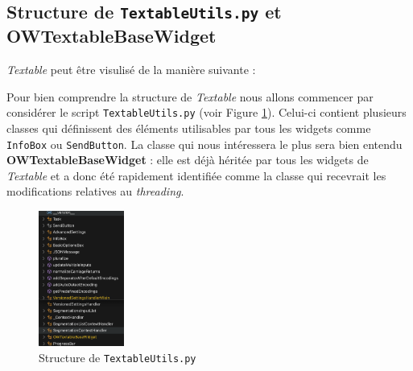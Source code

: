 \documentclass{article}
\begin{document}
\subsection{Structure de \texttt{TextableUtils.py} et \textbf{OWTextableBaseWidget}}

\textit{Textable} peut être visulisé de la manière suivante :
\vspace{5mm}

\vspace{5mm}

Pour bien comprendre la structure de \textit{Textable} nous allons commencer par considérer le script \texttt{TextableUtils.py} (voir Figure \ref{fig:textable_utils}). Celui-ci contient plusieurs classes qui définissent des éléments utilisables par tous les widgets comme \texttt{InfoBox} ou \texttt{SendButton}. La classe qui nous intéressera le plus sera bien entendu \textbf{OWTextableBaseWidget} : elle est déjà héritée par tous les widgets de \textit{Textable} et a donc été rapidement identifiée comme la classe qui recevrait les modifications relatives au \textit{threading}.

\vspace{5mm}

\begin{figure}[h]
    \centering
    \includegraphics[width=0.25\textwidth]{structure_utils.png}
    \caption{Structure de \texttt{TextableUtils.py}}
    \label{fig:textable_utils}
\end{figure}
\end{document}
